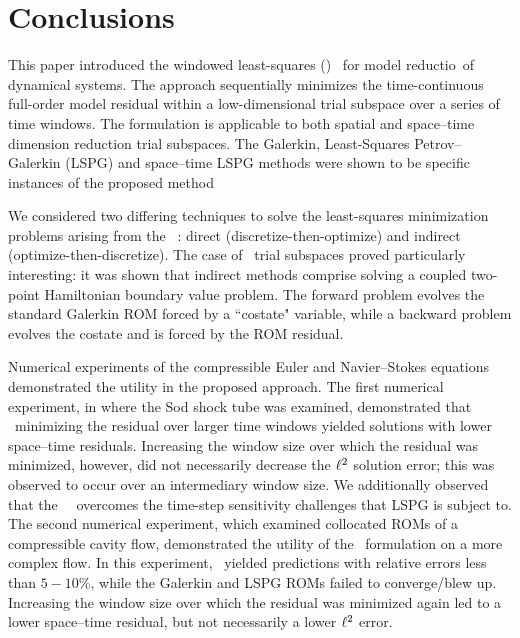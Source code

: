 \documentclass[3p,computermodern,10pt]{elsarticle}
\begin{document}
%
%






\section{Conclusions}\label{sec:conclude}
This paper introduced the windowed least-squares (\methodAcronym) \approachKwd\ for model reductio\  of dynamical systems. The approach sequentially minimizes the time-continuous full-order model residual within a low-dimensional trial subspace over a series of time windows. The formulation is applicable to both spatial and space--time dimension reduction trial subspaces. The Galerkin, Least-Squares Petrov--Galerkin (LSPG) and space--time LSPG methods were shown to be specific instances of the proposed method 

We considered two differing techniques to solve the least-squares minimization problems arising from the \methodAcronym\ \approachKwd: direct (discretize-then-optimize) and indirect (optimize-then-discretize). 
The case of \spatialAcronym\ trial subspaces proved particularly interesting: it was shown that indirect methods comprise solving a coupled two-point 
Hamiltonian boundary value problem. The forward problem evolves the standard Galerkin ROM forced by a ``costate" variable, while a backward problem evolves the costate and is forced by the ROM residual.

Numerical experiments of the compressible Euler and Navier--Stokes equations demonstrated the utility in the proposed approach. The first numerical experiment, in where the Sod shock tube was examined, demonstrated that \methodAcronymROMs\ minimizing the residual over larger time windows yielded solutions with lower space--time residuals. Increasing the window size over which the residual was minimized, however, did not necessarily decrease the $\ell^2$ solution error; this was observed to occur over an intermediary window size. We additionally observed that the  
\methodAcronym\ \approachKwd\ overcomes the time-step sensitivity challenges that LSPG is subject to. The second numerical experiment, which examined collocated ROMs of a compressible cavity flow, demonstrated the utility of the \methodAcronym\ formulation on a more complex flow. In this experiment, \methodAcronymROMs\ yielded predictions with relative errors less than $5-10\%$, while the Galerkin and LSPG ROMs failed to converge/blew up. Increasing the window size over which the residual was minimized again led to a lower space--time residual, but not necessarily a lower $\ell^2$ error.
\end{document}
